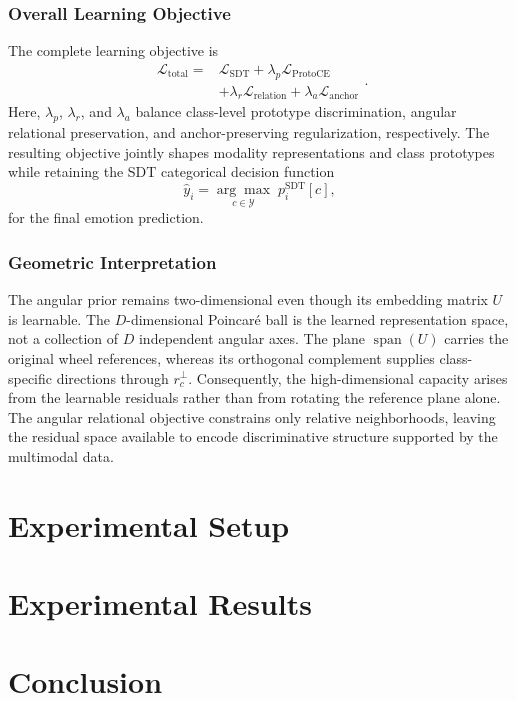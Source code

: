 \documentclass[letterpaper,journal]{IEEEtran}
\begin{document}
\subsubsection{Overall Learning Objective}

The complete learning objective is
\begin{equation}
    \boxed{\begin{aligned}
    \mathcal{L}_{\mathrm{total}}
    ={}&\mathcal{L}_{\mathrm{SDT}}
    +\lambda_p\mathcal{L}_{\mathrm{ProtoCE}}\\
    &+\lambda_r\mathcal{L}_{\mathrm{relation}}
    +\lambda_a\mathcal{L}_{\mathrm{anchor}}
    \end{aligned}}.
    \label{eq:rgrpl_objective}
\end{equation}
Here, \(\lambda_p\), \(\lambda_r\), and \(\lambda_a\) balance class-level
prototype discrimination, angular relational preservation, and
anchor-preserving regularization, respectively. The resulting objective
jointly shapes modality representations and class prototypes while retaining
the SDT categorical decision function
\begin{equation}
    \hat y_i
    =\underset{c\in\mathcal{Y}}{\arg\max}\;
    p_i^{\mathrm{SDT}}[c],
    \label{eq:rgrpl_prediction}
\end{equation}
for the final emotion prediction.

\subsubsection{Geometric Interpretation}

The angular prior remains two-dimensional even though its embedding matrix
\(U\) is learnable. The \(D\)-dimensional Poincar\'e ball is the learned
representation space, not a collection of \(D\) independent angular axes.
The plane \(\operatorname{span}(U)\) carries the original wheel references,
whereas its orthogonal complement supplies class-specific directions through
\(r_c^\perp\). Consequently, the high-dimensional capacity arises from the
learnable residuals rather than from rotating the reference plane alone. The
angular relational objective constrains only relative neighborhoods, leaving
the residual space available to encode discriminative structure supported by
the multimodal data.

\section{Experimental Setup}
\label{sec:experimental_setup}

\section{Experimental Results}
\label{sec:experimental_results}

\section{Conclusion}
\label{sec:conclusion}
\end{document}
